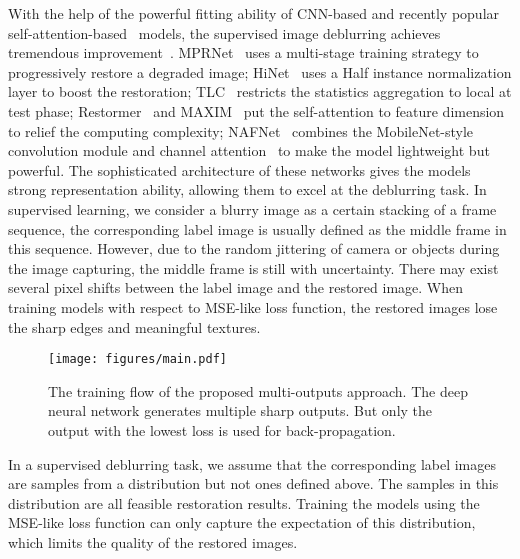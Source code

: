 \documentclass[letterpaper]{article} \usepackage{aaai23}  \usepackage{times}  \usepackage{helvet}  \usepackage{courier}  \usepackage[hyphens]{url}  \usepackage{graphicx} \urlstyle{rm} \def\UrlFont{\rm}  \usepackage{natbib}  \usepackage{caption} \frenchspacing  \setlength{\pdfpagewidth}{8.5in} \setlength{\pdfpageheight}{11in} \usepackage{algorithm}
\begin{document}
With the help of the powerful fitting ability of CNN-based and recently popular self-attention-based~\cite{vaswani2017attention,dosovitskiy2020image} models, the supervised image deblurring achieves tremendous improvement~\cite{dong2014learning,qiao2017learning,chen2021pre,liang2021swinir,chen2021hinet,park2020multi,zamir2022restormer,wang2022uformer,chu2021tlc}. 
MPRNet~\cite{zamir2021multi} uses a multi-stage training strategy to progressively restore a degraded image; HiNet~\cite{chen2021hinet} uses a Half instance normalization layer to boost the restoration; TLC~\cite{chu2021tlc} restricts the statistics aggregation to local at test phase; Restormer~\cite{zamir2022restormer} and MAXIM~\cite{tu2022maxim} put the self-attention to feature dimension to relief the computing complexity; NAFNet~\cite{chen2022simple} combines the MobileNet-style~\cite{howard2017mobilenets} convolution module and channel attention~\cite{hu2018squeeze} to make the model lightweight but powerful.
The sophisticated architecture of these networks gives the models strong representation ability, allowing them to excel at the deblurring task. In supervised learning, we consider a blurry image as a certain stacking of a frame sequence, the corresponding label image is usually defined as the middle frame in this sequence. However, due to the random jittering of camera or objects during the image capturing, the middle frame is still with uncertainty. There may exist several pixel shifts between the label image and the restored image. When training models with respect to MSE-like loss function, the restored images lose the sharp edges and meaningful textures.


\begin{figure*}[t]
    \centering
    \texttt{[image: figures/main.pdf]}
    \caption{The training flow of the proposed multi-outputs approach. The deep neural network generates multiple sharp outputs. But only the output with the lowest loss is used for back-propagation.}
    \label{fig:main}
\end{figure*}




In a supervised deblurring task, we assume that the corresponding label images are samples from a distribution but not ones defined above. The samples in this distribution are all feasible restoration results. Training the models using the MSE-like loss function can only capture the expectation of this distribution, which limits the quality of the restored images. 
\end{document}
